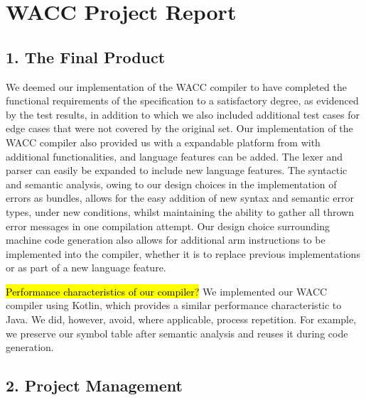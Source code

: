 \documentclass[10pt,a4paper]{report}
\begin{document}
  \section*{WACC Project Report}


  \subsection*{1. The Final Product}

  We deemed our implementation of the WACC compiler to have completed the
  functional requirements of the specification to a satisfactory degree, as
  evidenced by the test results, in addition to which we also included
  additional test cases for edge cases that were not covered by the original set.
  Our implementation of the WACC compiler also provided us with a expandable
  platform from with additional functionalities, and language features can be
  added. The lexer and parser can easily be expanded to include new language
  features. The syntactic and semantic analysis, owing to our design choices in
  the implementation of errors as bundles, allows for the easy addition of new
  syntax and semantic error types, under new conditions, whilst maintaining the
  ability to gather all thrown error messages in one compilation attempt.
  Our design choice surrounding machine code generation also allows for
  additional arm instructions to be implemented into the compiler, whether it is
  to replace previous implementations or as part of a new language feature.

  \hl{Performance characteristics of our compiler?}
  We implemented our WACC compiler using Kotlin, which provides a similar
  performance characteristic to Java. We did, however, avoid, where applicable,
  process repetition. For example, we preserve our symbol table after semantic
  analysis and reuses it during code generation.


  \subsection*{2. Project Management}
\end{document}
